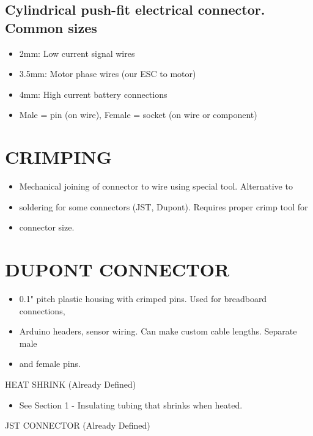 \documentclass[11pt,letterpaper]{article}
\begin{document}
\subsection{Cylindrical push-fit electrical connector. Common sizes}

\begin{itemize}
  \item 2mm: Low current signal wires
  \item 3.5mm: Motor phase wires (our ESC to motor)
  \item 4mm: High current battery connections
  \item Male = pin (on wire), Female = socket (on wire or component)
\end{itemize}

\section{CRIMPING}

\begin{itemize}
  \item Mechanical joining of connector to wire using special tool. Alternative to
  \item soldering for some connectors (JST, Dupont). Requires proper crimp tool for
  \item connector size.
\end{itemize}

\section{DUPONT CONNECTOR}

\begin{itemize}
  \item 0.1" pitch plastic housing with crimped pins. Used for breadboard connections,
  \item Arduino headers, sensor wiring. Can make custom cable lengths. Separate male
  \item and female pins.
\end{itemize}

HEAT SHRINK (Already Defined)\par

\begin{itemize}
  \item See Section 1 - Insulating tubing that shrinks when heated.
\end{itemize}

JST CONNECTOR (Already Defined)\par
\end{document}
